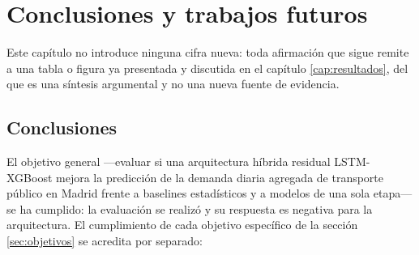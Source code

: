 \chapter{Conclusiones y trabajos futuros}\label{cap:conclusiones}

Este capítulo no introduce ninguna cifra nueva: toda afirmación que sigue remite a una
tabla o figura ya presentada y discutida en el capítulo \ref{cap:resultados}, del que es
una síntesis argumental y no una nueva fuente de evidencia.

\section{Conclusiones}\label{sec:conclusiones}

El objetivo general —evaluar si una arquitectura híbrida residual LSTM-XGBoost mejora la
predicción de la demanda diaria agregada de transporte público en Madrid frente a
baselines estadísticos y a modelos de una sola etapa— se ha cumplido: la evaluación se
realizó y su respuesta es negativa para la arquitectura. El cumplimiento de cada objetivo
específico de la sección \ref{sec:objetivos} se acredita por separado:

